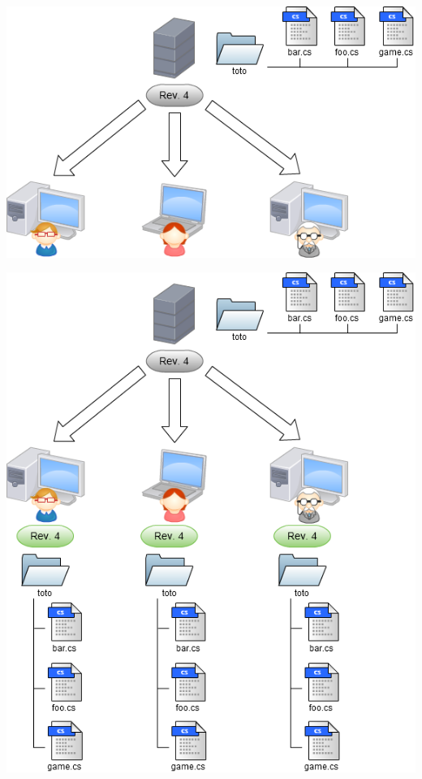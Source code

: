 \begin{frame}
  \begin{center}
    \includegraphics[scale=0.52]{images/1-CheckOut.png}
  \end{center}
\end{frame}

\begin{frame}
  \begin{center}
    \includegraphics[scale=0.3]{images/2-CheckOut.png}
  \end{center}
\end{frame}

